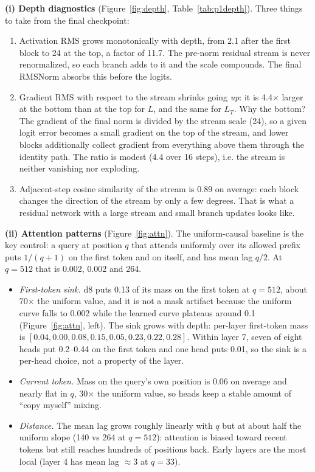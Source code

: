 \documentclass[10pt,letterpaper]{article}
\begin{document}
\textbf{(i) Depth diagnostics} (Figure~\ref{fig:depth}, Table~\ref{tab:p1depth}). Three things to take from the final checkpoint:
\begin{enumerate}
\item Activation RMS grows monotonically with depth, from 2.1 after the first block to 24 at the top, a factor of 11.7. The pre-norm residual stream is never renormalized, so each branch adds to it and the scale compounds. The final RMSNorm absorbs this before the logits.
\item Gradient RMS with respect to the stream shrinks going \emph{up}: it is 4.4$\times$ larger at the bottom than at the top for $L$, and the same for $L_T$. Why the bottom? The gradient of the final norm is divided by the stream scale (24), so a given logit error becomes a small gradient on the top of the stream, and lower blocks additionally collect gradient from everything above them through the identity path. The ratio is modest (4.4 over 16 steps), i.e. the stream is neither vanishing nor exploding.
\item Adjacent-step cosine similarity of the stream is 0.89 on average: each block changes the direction of the stream by only a few degrees. That is what a residual network with a large stream and small branch updates looks like.
\end{enumerate}

\textbf{(ii) Attention patterns} (Figure~\ref{fig:attn}). The uniform-causal baseline is the key control: a query at position $q$ that attends uniformly over its allowed prefix puts $1/(q{+}1)$ on the first token and on itself, and has mean lag $q/2$. At $q=512$ that is 0.002, 0.002 and 264.
\begin{itemize}
\item \emph{First-token sink.} d8 puts 0.13 of its mass on the first token at $q=512$, about 70$\times$ the uniform value, and it is not a mask artifact because the uniform curve falls to 0.002 while the learned curve plateaus around 0.1 (Figure~\ref{fig:attn}, left). The sink grows with depth: per-layer first-token mass is $[0.04, 0.00, 0.08, 0.15, 0.05, 0.23, 0.22, 0.28]$. Within layer 7, seven of eight heads put 0.2--0.44 on the first token and one head puts 0.01, so the sink is a per-head choice, not a property of the layer.
\item \emph{Current token.} Mass on the query's own position is 0.06 on average and nearly flat in $q$, 30$\times$ the uniform value, so heads keep a stable amount of ``copy myself'' mixing.
\item \emph{Distance.} The mean lag grows roughly linearly with $q$ but at about half the uniform slope (140 vs 264 at $q=512$): attention is biased toward recent tokens but still reaches hundreds of positions back. Early layers are the most local (layer 4 has mean lag $\approx 3$ at $q=33$).
\end{itemize}
\end{document}
